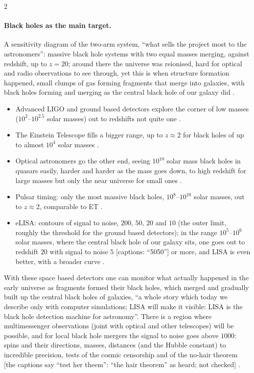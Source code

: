 \begin{paracol}{2}
\paragraph{Black holes as the main target.} A sensitivity diagram of the two-arm system, ``what sells the project most to the astronomers'': massive black hole systems with two equal masses merging, against redshift, up to $z=20$; around there the universe was reionised, hard for optical and radio observations to see through, yet this is when structure formation happened, small clumps of gas forming fragments that merge into galaxies, with black holes forming and merging as the central black hole of our galaxy did .
\begin{itemize}
  \item Advanced LIGO and ground based detectors explore the corner of low masses ($10^2$--$10^{2.5}$ solar masses) out to redshifts not quite one .
  \item The Einstein Telescope fills a bigger range, up to $z\approx2$ for black holes of up to almost $10^4$ solar masses .
  \item Optical astronomers go the other end, seeing $10^{10}$ solar mass black holes in quasars easily, harder and harder as the mass goes down, to high redshift for large masses but only the near universe for small ones .
  \item Pulsar timing: only the most massive black holes, $10^8$--$10^{10}$ solar masses, out to $z\approx2$, comparable to ET .
  \item eLISA: contours of signal to noise, $200$, $50$, $20$ and $10$ (the outer limit, roughly the threshold for the ground based detectors); in the range $10^5$--$10^6$ solar masses, where the central black hole of our galaxy sits, one goes out to redshift $20$ with signal to noise $5$ [captions: ``5050''] or more, and LISA is even better, with a broader curve .
\end{itemize}
With these space based detectors one can monitor what actually happened in the early universe as fragments formed their black holes, which merged and gradually built up the central black holes of galaxies, ``a whole story which today we describe only with computer simulations; LISA will make it visible: LISA is the black hole detection machine for astronomy''. There is a region where multimessenger observations (joint with optical and other telescopes) will be possible, and for local black hole mergers the signal to noise goes above $1000$: spins and their directions, masses, distances (and the Hubble constant) to incredible precision, tests of the cosmic censorship and of the no-hair theorem [the captions say ``test her theem'': ``the hair theorem'' as heard; not checked] .


\end{paracol}
